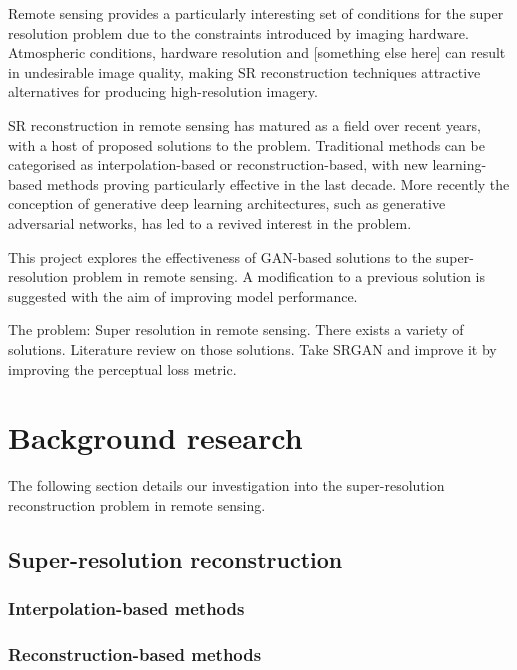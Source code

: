 Remote sensing provides a particularly interesting set of conditions for the super resolution problem due to the constraints introduced by imaging hardware. Atmospheric conditions, hardware resolution and [something else here] can result in undesirable image quality, making SR reconstruction techniques attractive alternatives for producing high-resolution imagery.

SR reconstruction in remote sensing has matured as a field over recent years, with a host of proposed solutions to the problem. Traditional methods can be categorised as interpolation-based or reconstruction-based, with new learning-based methods proving particularly effective in the last decade. More recently the conception of generative deep learning architectures, such as generative adversarial networks, has led to a revived interest in the problem.

This project explores the effectiveness of GAN-based solutions to the super-resolution problem in remote sensing. A modification to a previous solution is suggested with the aim of improving model performance.

The problem: Super resolution in remote sensing. There exists a variety of solutions. Literature review on those solutions. Take SRGAN and improve it by improving the perceptual loss metric.

\section{Background research}\label{sec:background_research}
The following section details our investigation into the super-resolution reconstruction problem in remote sensing.

\subsection{Super-resolution reconstruction}

\subsubsection{Interpolation-based methods}

\subsubsection{Reconstruction-based methods}

